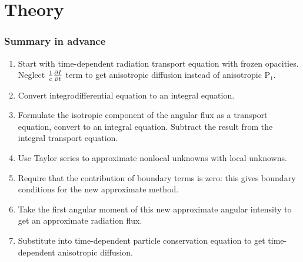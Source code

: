 \documentclass[draft]{beamer}
\begin{document}
\section{Theory}
\begin{frame}
  \frametitle{Summary in advance}
  \begin{enumerate}
    \item Start with time-dependent radiation transport equation with frozen
      opacities. Neglect $\frac{1}{c}\frac{\partial I}{\partial t}$ term to get anisotropic
      diffusion instead of anisotropic P$_1$.
    \item Convert integrodifferential equation to an integral equation.
    \item Formulate the isotropic component of the angular flux as a transport
      equation, convert to an integral equation. Subtract the result from the
      integral transport equation.
    \item Use Taylor series to approximate nonlocal unknowns with local
      unknowns.
    \item Require that the contribution of boundary terms is zero: this gives
      boundary conditions for the new approximate method.
    \item Take the first angular moment of this new approximate angular
      intensity to get an approximate radiation flux.
    \item Substitute into time-dependent particle conservation equation to get
      time-dependent anisotropic diffusion.
  \end{enumerate}
\end{frame}
\end{document}

